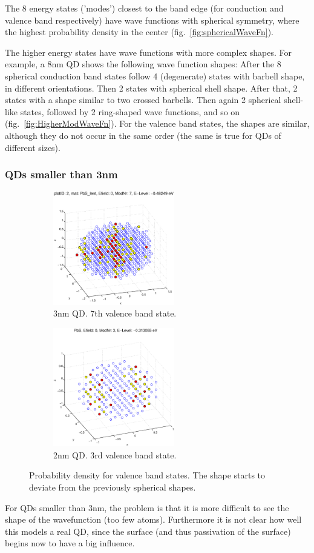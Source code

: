 %
	The 8 energy states ('modes') closest to the band edge (for conduction and valence band respectively) have wave functions with spherical symmetry, where the highest probability density in the center (fig.~\ref{fig:sphericalWaveFn}).
	
	The higher energy states have wave functions with more complex shapes. For example, a 8nm QD shows the following wave function shapes: After the 8 spherical conduction band states follow 4 (degenerate) states with barbell shape, in different orientations. Then 2 states with spherical shell shape. After that, 2 states with a shape similar to two crossed barbells. Then again 2 spherical shell-like states, followed by 2 ring-shaped wave functions, and so on (fig.~\ref{fig:HigherModWaveFn}). For the valence band states, the shapes are similar, although they do not occur in the same order (the same is true for QDs of different sizes).
\subsubsection{QDs smaller than 3nm}	
\begin{figure}
	\centering
	\begin{subfigure}{200px}
		\includegraphics[width=200px]{Fig/Plots/r15VBmod7}
		\caption{3nm QD. 7th valence band state.}
	\end{subfigure}
	\begin{subfigure}{200px}
		\includegraphics[width=200px]{Fig/Plots/r1VBmod3}
		\caption{2nm QD. 3rd valence band state.}
	\end{subfigure}
	\caption{Probability density for valence band states. The shape starts to deviate from the previously spherical shapes.}
	\label{fig:asymWaveFn}
\end{figure}
%
	For QDs smaller than 3nm, the problem is that it is more difficult to see the shape of the wavefunction (too few atoms). Furthermore it is not clear how well this models a real QD, since the surface (and thus passivation of the surface) begins now to have a big influence.
	
